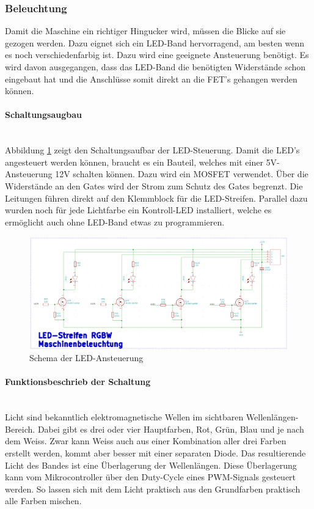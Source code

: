 \subsubsection{Beleuchtung}
\label{subsec:Beleuchtung}


Damit die Maschine ein richtiger Hingucker wird, müssen die Blicke auf sie gezogen werden. Dazu eignet sich ein LED-Band hervorragend, am besten wenn es noch verschiedenfarbig ist. Dazu wird eine geeignete Ansteuerung benötigt. Es wird davon ausgegangen, dass das LED-Band die benötigten Widerstände schon eingebaut hat und die Anschlüsse somit direkt an die FET's gehangen werden können.

\paragraph{Schaltungsaugbau}\mbox{}\\

Abbildung \ref{fig:Schema_LED} zeigt den Schaltungsaufbar der LED-Steuerung. Damit die LED's angesteuert werden können, braucht es ein Bauteil, welches mit einer 5V-Ansteuerung 12V schalten können. Dazu wird ein MOSFET verwendet. Über die Widerstände an den Gates wird der Strom zum Schutz des Gates begrenzt. Die Leitungen führen direkt auf den Klemmblock für die LED-Streifen. Parallel dazu wurden noch für jede Lichtfarbe ein Kontroll-LED installiert, welche es ermöglicht auch ohne LED-Band etwas zu programmieren.

\begin{figure}[!h]
\center
\includegraphics[width = 0.5 \textwidth]{graphics/Schema_LED}
\caption{Schema der LED-Ansteuerung}
\label{fig:Schema_LED}
\end{figure}

\paragraph{Funktionsbeschrieb der Schaltung}\mbox{}\\

Licht sind bekanntlich elektromagnetische Wellen im sichtbaren Wellenlängen-Bereich. Dabei gibt es drei oder vier Hauptfarben, Rot, Grün, Blau und je nach dem Weiss. Zwar kann Weiss auch aus einer Kombination aller drei Farben erstellt werden, kommt aber besser mit einer separaten Diode. Das resultierende Licht des Bandes ist eine Überlagerung der Wellenlängen. Diese Überlagerung kann vom Mikrocontroller über den Duty-Cycle eines PWM-Signals gesteuert werden. So lassen sich mit dem Licht praktisch aus den Grundfarben praktisch alle Farben mischen.